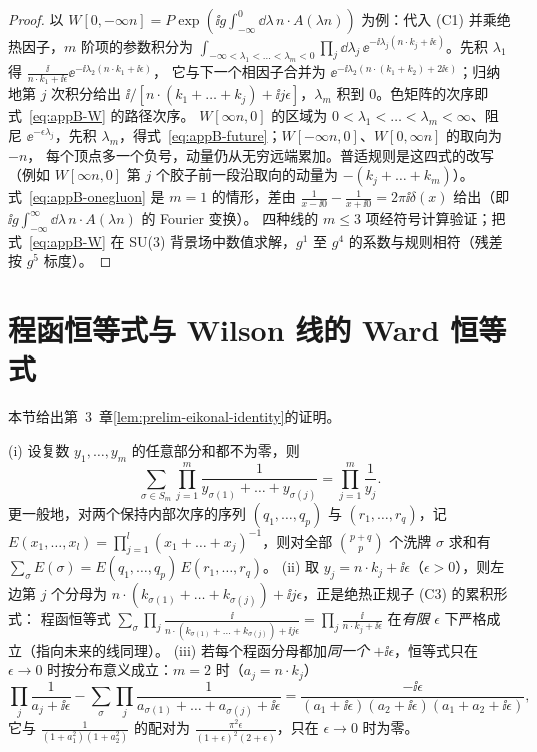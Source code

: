\begin{proof}
以 $W[0,-\infty n]=P\exp(\ii g\int_{-\infty}^0\dd\lambda\,n\cdot A(\lambda n))$ 为例：代入 (C1) 并乘绝热因子，$m$ 阶项的参数积分为
$\int_{-\infty<\lambda_1<\dots<\lambda_m<0}\prod_j\dd\lambda_j\,\ee^{-\ii\lambda_j(n\cdot k_j+\ii\epsilon)}$。先积 $\lambda_1$ 得 $\frac{\ii}{n\cdot k_1+\ii\epsilon}\ee^{-\ii\lambda_2(n\cdot k_1+\ii\epsilon)}$，
它与下一个相因子合并为 $\ee^{-\ii\lambda_2(n\cdot(k_1+k_2)+2\ii\epsilon)}$；归纳地第 $j$ 次积分给出 $\ii/[n\cdot(k_1+\dots+k_j)+\ii j\epsilon]$，$\lambda_m$ 积到 $0$。色矩阵的次序即式~\eqref{eq:appB-W} 的路径次序。
$W[\infty n,0]$ 的区域为 $0<\lambda_1<\dots<\lambda_m<\infty$、阻尼 $\ee^{-\epsilon\lambda_j}$，先积 $\lambda_m$，得式~\eqref{eq:appB-future}；$W[-\infty n,0]$、$W[0,\infty n]$ 的取向为 $-n$，
每个顶点多一个负号，动量仍从无穷远端累加。普适规则是这四式的改写（例如 $W[\infty n,0]$ 第 $j$ 个胶子前一段沿取向的动量为 $-(k_j+\dots+k_m)$）。
式~\eqref{eq:appB-onegluon} 是 $m=1$ 的情形，差由 $\frac1{x-\ii0}-\frac1{x+\ii0}=2\pi\ii\delta(x)$ 给出（即 $\ii g\int_{-\infty}^\infty\dd\lambda\,n\cdot A(\lambda n)$ 的 Fourier 变换）。
四种线的 $m\le3$ 项经符号计算验证；把式~\eqref{eq:appB-W} 在 SU(3) 背景场中数值求解，$g^1$ 至 $g^4$ 的系数与规则相符（残差按 $g^5$ 标度）。%
\end{proof}
\section{程函恒等式与 Wilson 线的 Ward 恒等式}\label{sec:appB-eikonal}

本节给出第~3~章\cref{lem:prelim-eikonal-identity}的证明。

\begin{lemma}\label{lem:appB-shuffle}
(i) 设复数 $y_1,\dots,y_m$ 的任意部分和都不为零，则
\begin{equation}\label{eq:appB-shuffle}
\sum_{\sigma\in S_m}\prod_{j=1}^m\frac{1}{y_{\sigma(1)}+\dots+y_{\sigma(j)}}=\prod_{j=1}^m\frac1{y_j}.
\end{equation}
更一般地，对两个保持内部次序的序列 $(q_1,\dots,q_p)$ 与 $(r_1,\dots,r_q)$，记 $E(x_1,\dots,x_l)=\prod_{j=1}^l(x_1+\dots+x_j)^{-1}$，则对全部 $\binom{p+q}{p}$ 个洗牌 $\sigma$ 求和有
$\sum_\sigma E(\sigma)=E(q_1,\dots,q_p)\,E(r_1,\dots,r_q)$。
(ii) 取 $y_j=n\cdot k_j+\ii\epsilon$（$\epsilon>0$），则左边第 $j$ 个分母为 $n\cdot(k_{\sigma(1)}+\dots+k_{\sigma(j)})+\ii j\epsilon$，正是绝热正规子 (C3) 的累积形式：
程函恒等式 $\sum_\sigma\prod_j\frac{\ii}{n\cdot(k_{\sigma(1)}+\dots+k_{\sigma(j)})+\ii j\epsilon}=\prod_j\frac{\ii}{n\cdot k_j+\ii\epsilon}$ 在\emph{有限} $\epsilon$ 下严格成立（指向未来的线同理）。
(iii) 若每个程函分母都加\emph{同一个} $+\ii\epsilon$，恒等式只在 $\epsilon\to0$ 时按分布意义成立：$m=2$ 时（$a_j=n\cdot k_j$）
\[
\prod_j\frac{1}{a_j+\ii\epsilon}-\sum_\sigma\prod_j\frac{1}{a_{\sigma(1)}+\dots+a_{\sigma(j)}+\ii\epsilon}=\frac{-\ii\epsilon}{(a_1+\ii\epsilon)(a_2+\ii\epsilon)(a_1+a_2+\ii\epsilon)},
\]
它与 $\frac1{(1+a_1^2)(1+a_2^2)}$ 的配对为 $\frac{\pi^2\epsilon}{(1+\epsilon)^2(2+\epsilon)}$，只在 $\epsilon\to0$ 时为零。
\end{lemma}

